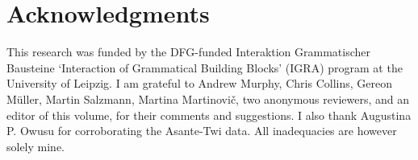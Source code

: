\documentclass[output=paper]{LSP/langsci}
\begin{document}
\section*{\textbf{Acknowledgments}}

This research was funded by the DFG-funded Interaktion Grammatischer Bausteine `Interaction of Grammatical Building Blocks' (IGRA) program at the University of Leipzig. I am grateful to Andrew Murphy, Chris Collins, Gereon M\"uller, Martin Salzmann, Martina Martinovi\v c,  two anonymous reviewers, and an editor of this volume, for their comments and suggestions. I also thank Augustina P. Owusu for corroborating the Asante-Twi data. All inadequacies are however solely mine.



\printbibliography[heading=subbibliography,notkeyword=this]
\end{document}
